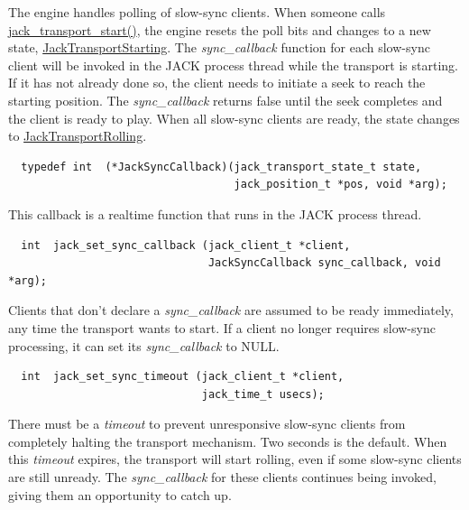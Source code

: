 The engine handles polling of slow-sync clients. When someone calls \hyperlink{transport_8h_6c868184c830c2e84b7ea4d04ab1aba9}{jack\_\-transport\_\-start()}, the engine resets the poll bits and changes to a new state, \hyperlink{transport_8h_499ffea77b03cce9c647d7b5065f733826f99f6e435fe2f37ffce708fe128d12}{Jack\-Transport\-Starting}. The {\em sync\_\-callback\/} function for each slow-sync client will be invoked in the JACK process thread while the transport is starting. If it has not already done so, the client needs to initiate a seek to reach the starting position. The {\em sync\_\-callback\/} returns false until the seek completes and the client is ready to play. When all slow-sync clients are ready, the state changes to \hyperlink{transport_8h_499ffea77b03cce9c647d7b5065f733807b572e2dbc92cf006e07cc23befaece}{Jack\-Transport\-Rolling}.



\footnotesize\begin{verbatim}  typedef int  (*JackSyncCallback)(jack_transport_state_t state,
                                   jack_position_t *pos, void *arg);
\end{verbatim}
\normalsize


This callback is a realtime function that runs in the JACK process thread.



\footnotesize\begin{verbatim}  int  jack_set_sync_callback (jack_client_t *client,
                               JackSyncCallback sync_callback, void *arg);
\end{verbatim}
\normalsize


Clients that don't declare a {\em sync\_\-callback\/} are assumed to be ready immediately, any time the transport wants to start. If a client no longer requires slow-sync processing, it can set its {\em sync\_\-callback\/} to NULL.



\footnotesize\begin{verbatim}  int  jack_set_sync_timeout (jack_client_t *client,
                              jack_time_t usecs);
\end{verbatim}
\normalsize


There must be a {\em timeout\/} to prevent unresponsive slow-sync clients from completely halting the transport mechanism. Two seconds is the default. When this {\em timeout\/} expires, the transport will start rolling, even if some slow-sync clients are still unready. The {\em sync\_\-callback\/} for these clients continues being invoked, giving them an opportunity to catch up.



